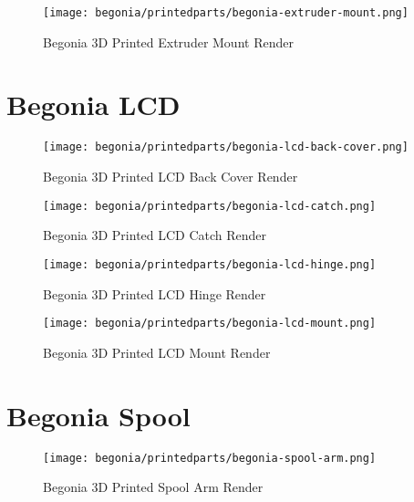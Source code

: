 \begin{figure}[H]
\centering
\texttt{[image: begonia/printedparts/begonia-extruder-mount.png]}
\caption{Begonia 3D Printed Extruder Mount Render}
\label{fig:begextrudermount}
\end{figure}

\section{Begonia LCD}

\begin{figure}[H]
\centering
\texttt{[image: begonia/printedparts/begonia-lcd-back-cover.png]}
\caption{Begonia 3D Printed LCD Back Cover Render}
\label{fig:beglcdbackcover}
\end{figure}

\begin{figure}[H]
\centering
\texttt{[image: begonia/printedparts/begonia-lcd-catch.png]}
\caption{Begonia 3D Printed LCD Catch Render}
\label{fig:beglcdcatch}
\end{figure}

\begin{figure}[H]
\centering
\texttt{[image: begonia/printedparts/begonia-lcd-hinge.png]}
\caption{Begonia 3D Printed LCD Hinge Render}
\label{fig:beglcdhinge}
\end{figure}

\begin{figure}[H]
\centering
\texttt{[image: begonia/printedparts/begonia-lcd-mount.png]}
\caption{Begonia 3D Printed LCD Mount Render}
\label{fig:beglcdmount}
\end{figure}


\section{Begonia Spool}

\begin{figure}[H]
\centering
\texttt{[image: begonia/printedparts/begonia-spool-arm.png]}
\caption{Begonia 3D Printed Spool Arm Render}
\label{fig:begspoolarm}
\end{figure}

